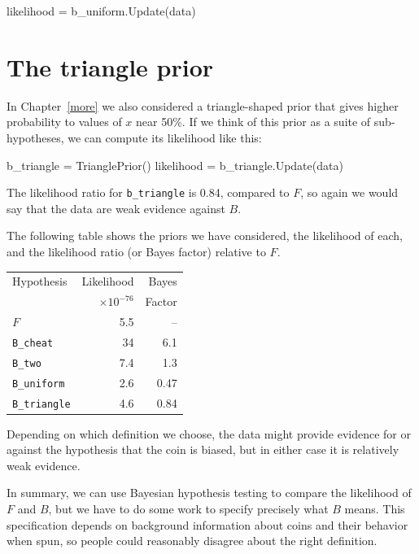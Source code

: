 \documentclass[12pt]{book}
\theoremstyle{exercise}
\begin{document}
\begin{code}
    likelihood = b_uniform.Update(data)
\end{code}



\section{The triangle prior}

In Chapter~\ref{more} we also considered a triangle-shaped prior that
gives higher probability to values of $x$ near 50\%.  If we think of
this prior as a suite of sub-hypotheses, we can compute its likelihood
like this:

\begin{code}
    b_triangle = TrianglePrior()
    likelihood = b_triangle.Update(data)
\end{code}

The likelihood ratio for \verb"b_triangle" is 0.84, compared to $F$, so
again we would say that the data are weak evidence against $B$.

The following table shows the priors we have considered, the
likelihood of each, and the likelihood ratio (or Bayes factor)
relative to $F$.

\begin{tabular}{|l|r|r|}
\hline
Hypothesis   & Likelihood & Bayes  \\
             & $\times 10^{-76}$ & Factor  \\
\hline
$F$              & 5.5   & --   \\
\verb"B_cheat"  & 34   &  6.1   \\
\verb"B_two"     & 7.4   &  1.3   \\
\verb"B_uniform"  & 2.6   &  0.47   \\
\verb"B_triangle"  & 4.6   &  0.84   \\
\hline
\end{tabular}

Depending on which definition we choose, the data might provide
evidence for or against the hypothesis that the coin is biased, but
in either case it is relatively weak evidence.

In summary, we can use Bayesian hypothesis testing to compare the
likelihood of $F$ and $B$, but we have to do some work to specify
precisely what $B$ means.  This specification depends on background
information about coins and their behavior when spun, so people
could reasonably disagree about the right definition.
\end{document}
